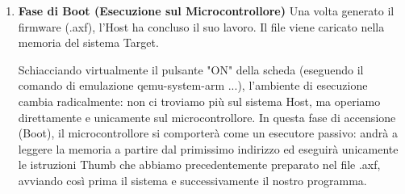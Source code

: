 \begin{enumerate}
    \item \textbf{Fase di Boot (Esecuzione sul Microcontrollore)}
    Una volta generato il firmware (.axf), l'Host ha concluso il suo lavoro. Il file viene caricato nella memoria del sistema Target.

    Schiacciando virtualmente il pulsante "ON" della scheda (eseguendo il comando di emulazione qemu-system-arm ...), l'ambiente di esecuzione cambia radicalmente: non ci troviamo più sul sistema Host, ma operiamo direttamente e unicamente sul microcontrollore.
    In questa fase di accensione (Boot), il microcontrollore si comporterà come un esecutore passivo: andrà a leggere la memoria a partire dal primissimo indirizzo ed eseguirà unicamente le istruzioni Thumb che abbiamo precedentemente preparato nel file .axf, avviando così prima il sistema e successivamente il nostro programma.

\end{enumerate}







